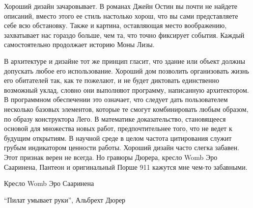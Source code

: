 \documentclass[ebook,12pt,oneside,openany]{memoir}
\begin{document}
Хороший дизайн зачаровывает. В романах Джейн Остин вы почти не найдете
описаний, вместо этого ее стиль настолько хорош, что вы сами
представляете себе всю обстановку. Также и картина, оставляющая место
воображению, захватывает нас гораздо больше, чем та, что точно
фиксирует события. Каждый самостоятельно продолжает историю Моны Лизы.

В архитектуре и дизайне тот же принцип гласит, что здание или объект
должны допускать любое его использование. Хороший дом позволить
организовать жизнь его обитателей так, как те пожелают, и не будет
диктовать единственно возможный уклад, словно они выполняют программу,
написанную архитектором. В программном обеспечении это означает, что
следует дать пользователем несколько базовых элементов, которые те
смогут комбинировать любым образом, по образу конструктора Лего. В
математике доказательство, становящееся основой для множества новых
работ, предпочтительнее того, что не ведет к будущим открытиям. В
научной среде в целом частота цитирования служит грубым индикатором
ценности работы. Хороший дизайн часто слегка забавен. Этот признак
верен не всегда. Но гравюры Дюрера, кресло Womb Эро Сааринена, Пантеон
и оригинальный Порше 911 кажутся мне чем-то забавными.

Кресло Womb Эро Сааринена

“Пилат умывает руки”, Альбрехт Дюрер
\end{document}
